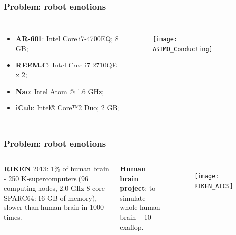 \documentclass[12pt]{beamer}
\begin{document}

\begin{frame}
\frametitle{Problem: robot emotions}
\begin{columns}[c] %

\begin{itemize}
\item \textbf{AR-601}: Intel Core i7-4700EQ; 8 GB;
\item \textbf{REEM-C}: Intel Core i7 2710QE x 2;
\item \textbf{Nao}: Intel Atom @ 1.6 GHz;
\item \textbf{iCub}: Intel® Core™2 Duo; 2 GB;
\end{itemize}


\begin{figure}
\texttt{[image: ASIMO\_Conducting]}
\end{figure}
\end{columns}
\end{frame}


\begin{frame}
\frametitle{Problem: robot emotions}
\begin{columns}[c] %

\textbf{RIKEN} 2013: 1\% of human brain - 250 K-supercomputers
(96 computing nodes, 2.0 GHz 8-core SPARC64; 16 GB of memory), slower than human brain in 1000 times. 


\textbf{Human brain project}: to simulate whole human brain -- 10 exaflop.


\begin{figure}
\texttt{[image: RIKEN\_AICS]}
\end{figure}
\end{columns}
\end{frame}


\end{document}

